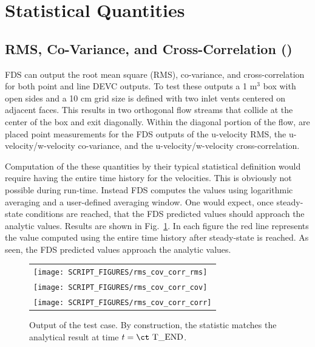\documentclass[11pt]{book}
\begin{document}
\section{Statistical Quantities}

\subsection{RMS, Co-Variance, and Cross-Correlation (\texorpdfstring{}{rms\_cov\_corr})}

FDS can output the root mean square (RMS), co-variance, and cross-correlation for both point and line {\ct DEVC} outputs.  To test these outputs a 1 m$^3$ box with open sides and a 10 cm grid size is defined with two inlet vents centered on adjacent faces.  This results in two orthogonal flow streams that collide at the center of the box and exit diagonally.  Within the diagonal portion of the flow, are placed point measurements for the FDS outputs of the u-velocity RMS, the u-velocity/w-velocity co-variance, and the u-velocity/w-velocity cross-correlation.

Computation of the these quantities by their typical statistical definition would require having the entire time history for the velocities.  This is obviously not possible during run-time.  Instead FDS computes the values using logarithmic averaging and a user-defined averaging window.  One would expect, once steady-state conditions are reached, that the FDS predicted values should approach the analytic values.  Results are shown in Fig.~\ref{rms_cov_corr_plots}.  In each figure the red line represents the value computed using the entire time history after steady-state is reached.  As seen, the FDS predicted values approach the analytic values.

\begin{figure}[p]
\centering
\begin{tabular}{l}
\texttt{[image: SCRIPT\_FIGURES/rms\_cov\_corr\_rms]}\\
\texttt{[image: SCRIPT\_FIGURES/rms\_cov\_corr\_cov]} \\
\texttt{[image: SCRIPT\_FIGURES/rms\_cov\_corr\_corr]}
\end{tabular}
\caption[Sample case ]{Output of the  test case.  By construction, the statistic matches the analytical result at time $t = \mbox{\ct T\_END}$.}
\label{rms_cov_corr_plots}
\end{figure}

\FloatBarrier
\end{document}
